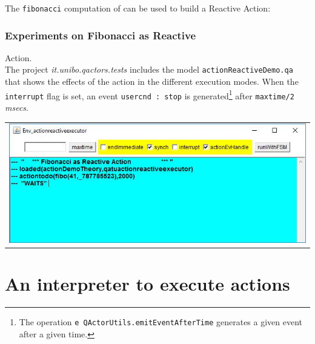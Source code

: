  
The \texttt{fibonacci} computation of  can be used to build a Reactive Action:



\subsubsection{Experiments on Fibonacci as Reactive} Action.\\

 
The project \textit{it.unibo.qactors.tests} includes the model \texttt{actionReactiveDemo.qa} that shows the effects of the action in the different execution modes. When the \texttt{interrupt} flag is set, an event \texttt{usercnd : stop} is generated\footnote{The operation \texttt{e QActorUtils.emitEventAfterTime}  generates a given event after a given time.} after \texttt{maxtime/2} \textit{msecs}. 



\begin{center}
\begin{tabular}{ c }
     \includegraphics[scale = 0.6]{img/actionReactive.jpg}\\
\end{tabular} 
\end{center}




\newpage  
\section{An interpreter to execute actions}

